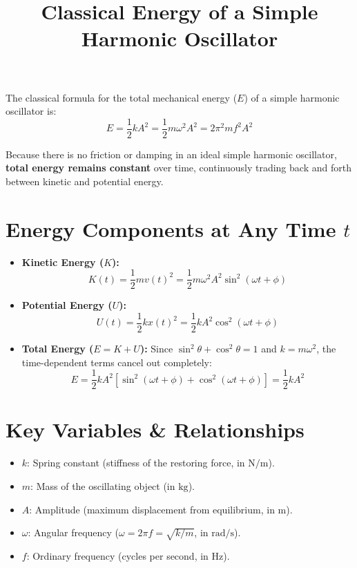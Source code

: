\documentclass[11pt]{article}
\title{Classical Energy of a Simple Harmonic Oscillator}
\date{}
\begin{document}
\maketitle

The classical formula for the total mechanical energy ($E$) of a simple harmonic oscillator is:
\begin{equation}
E = \frac{1}{2}kA^2 = \frac{1}{2}m\omega^2 A^2 = 2\pi^2 m f^2 A^2
\end{equation}

Because there is no friction or damping in an ideal simple harmonic oscillator, \textbf{total energy remains constant} over time, continuously trading back and forth between kinetic and potential energy.

\section{Energy Components at Any Time $t$}

\begin{itemize}
    \item \textbf{Kinetic Energy ($K$):}
    \begin{equation}
    K(t) = \frac{1}{2}mv(t)^2 = \frac{1}{2}m\omega^2 A^2 \sin^2(\omega t + \phi)
    \end{equation}
    
    \item \textbf{Potential Energy ($U$):}
    \begin{equation}
    U(t) = \frac{1}{2}kx(t)^2 = \frac{1}{2}kA^2 \cos^2(\omega t + \phi)
    \end{equation}
    
    \item \textbf{Total Energy ($E = K + U$):} Since $\sin^2\theta + \cos^2\theta = 1$ and $k = m\omega^2$, the time-dependent terms cancel out completely:
    \begin{equation}
    E = \frac{1}{2}kA^2 \left[\sin^2(\omega t + \phi) + \cos^2(\omega t + \phi)\right] = \frac{1}{2}kA^2
    \end{equation}
\end{itemize}

\section{Key Variables \& Relationships}

\begin{itemize}
    \item $k$: Spring constant (stiffness of the restoring force, in $\text{N/m}$).
    \item $m$: Mass of the oscillating object (in $\text{kg}$).
    \item $A$: Amplitude (maximum displacement from equilibrium, in $\text{m}$).
    \item $\omega$: Angular frequency ($\omega = 2\pi f = \sqrt{k/m}$, in $\text{rad/s}$).
    \item $f$: Ordinary frequency (cycles per second, in $\text{Hz}$).
\end{itemize}
\end{document}

